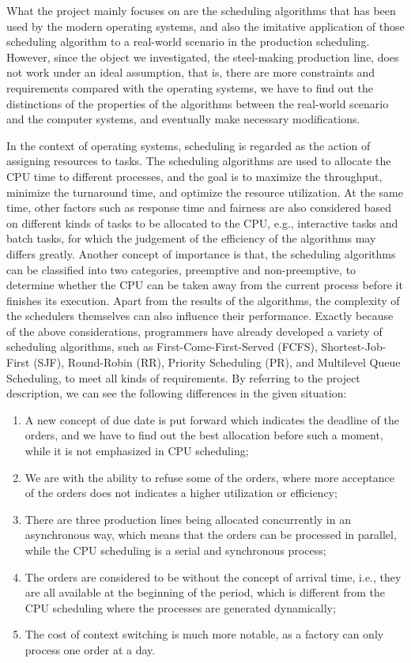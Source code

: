 \documentclass[a4paper, 12pt]{article}
\begin{document}
What the project mainly focuses on are the scheduling algorithms that has been used by the modern operating systems, and also the imitative application of those scheduling algorithm to a real-world scenario in the production scheduling. However,
since the object we investigated, the steel-making production line, does not work under an ideal assumption, that is, there are more constraints and requirements compared with the operating systems, we have to find out the distinctions of the properties of the algorithms between the real-world scenario and the computer systems,
and eventually make necessary modifications.

In the context of operating systems, scheduling is regarded as the action of assigning resources to tasks.
The scheduling algorithms are used to allocate the CPU time to different processes, and the goal is to maximize the throughput, minimize the turnaround time, and optimize the resource utilization.
At the same time, other factors such as response time and fairness are also considered based on different kinds of tasks to be allocated to the CPU, e.g., interactive tasks and batch tasks, for which the judgement of the efficiency of the algorithms may differs greatly.
Another concept of importance is that, the scheduling algorithms can be classified into two categories, preemptive and non-preemptive, to determine whether the CPU can be taken away from the current process before it finishes its execution.
Apart from the results of the algorithms, the complexity of the schedulers themselves can also influence their performance.
Exactly because of the above considerations, programmers have already developed a variety of scheduling algorithms, such as First-Come-First-Served (FCFS), Shortest-Job-First (SJF), Round-Robin (RR), Priority Scheduling (PR), and Multilevel Queue Scheduling, to meet all kinds of requirements.
By referring to the project description, we can see the following differences in the given situation: 

\begin{enumerate}
    \item A new concept of due date is put forward which indicates the deadline of the orders, and we have to find out the best allocation before such a moment, while it is not emphasized in CPU scheduling; 
    \item We are with the ability to refuse some of the orders, where more acceptance of the orders does not indicates a higher utilization or efficiency;
    \item There are three production lines being allocated concurrently in an asynchronous way, which means that the orders can be processed in parallel, while the CPU scheduling is a serial and synchronous process;
    \item The orders are considered to be without the concept of arrival time, i.e., they are all available at the beginning of the period, which is different from the CPU scheduling where the processes are generated dynamically;
    \item The cost of context switching is much more notable, as a factory can only process one order at a day.
\end{enumerate}
\end{document}
